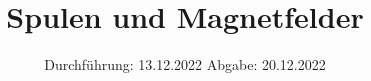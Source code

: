 



\subject{V308}
\title{Spulen und Magnetfelder}
\date{%
  Durchführung: 13.12.2022
  \hspace{3em}
  Abgabe: 20.12.2022
}


\setlength{\parindent}{0pt} %

\maketitle
\thispagestyle{empty}
\tableofcontents
\newpage







\printbibliography{}


